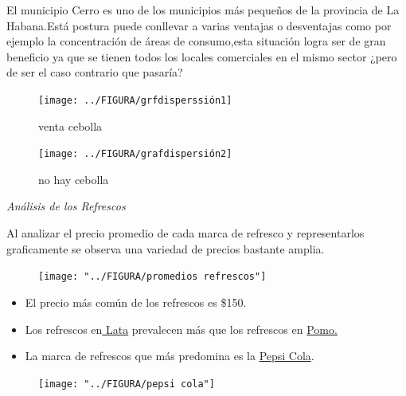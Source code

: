 \documentclass[10pt]{beamer}
\begin{document}
   	\begin{frame}
   		
   		
   		 El municipio Cerro es uno de los municipios más pequeños de la provincia de La Habana.Está postura puede conllevar a varias ventajas o desventajas como por ejemplo la concentración de áreas de consumo,esta situación logra ser de gran beneficio ya que se tienen todos los locales comerciales en el mismo sector ¿pero de ser el caso contrario que pasaría? 
   	
   		\begin{figure}
   			\centering
   			\texttt{[image: ../FIGURA/grfdisperssión1]}
   			\caption{venta cebolla}
   			\label{fig:grfdisperssion1}
   		\end{figure}
   		
   		\begin{figure}
   			\centering
   			\texttt{[image: ../FIGURA/grafdispersión2]}
   			\caption{no hay cebolla}
   			\label{fig:grafdispersion2}
   		\end{figure}
   		
   		
   	\end{frame}	
   		
  
   	
   \begin{frame}{\textit{Análisis de los Refrescos}}
   	
   	Al analizar el precio promedio de cada marca de refresco y representarlos graficamente se observa una variedad de precios bastante amplia.
   	
   	  \begin{figure}
   		\centering
   		\texttt{[image: "../FIGURA/promedios refrescos"]}
   		\caption{}
   		\label{fig:promedios-refrescos}
     \end{figure}
   	
   \end{frame}
   	
   	\begin{frame}
   		
   		\begin{itemize}
   			\item{El precio más común de los refrescos es \$150.}
   				\item{Los refrescos en\underline{ Lata} prevalecen más que los refrescos en \underline{Pomo.}}
   			\item{La marca de refrescos que más predomina es la \underline{Pepsi Cola}.}
   	    \end{itemize}
   		
   		
   		\begin{figure}
   			\centering
   			\texttt{[image: "../FIGURA/pepsi cola"]}
   			\caption{}
   			\label{fig:pepsi-cola}
   		\end{figure}
   		
   	\end{frame}
   	
\end{document}

